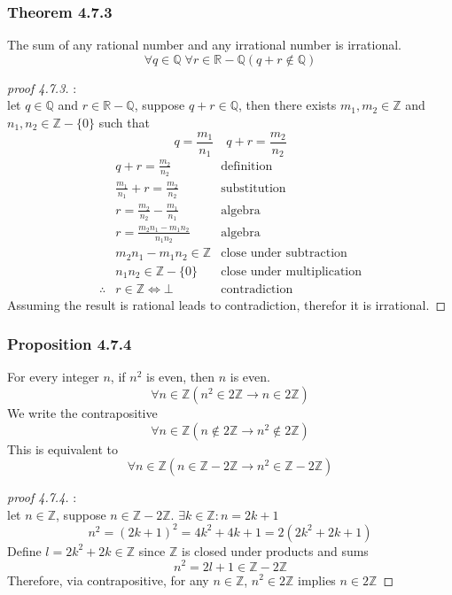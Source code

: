 \documentclass[12pt]{book}
\newcommand{\F}[0]{\bot}
\newcommand{\Z}{\mathbb{Z}}
\newcommand{\R}{\mathbb{R}}
\newcommand{\Q}{\mathbb{Q}}
\newcommand{\paren}[1]{\left( #1 \right)}
\newcommand{\zero}{\{0\}}
\begin{document}
\subsubsection{Theorem 4.7.3}
The sum of any rational number and any irrational number is irrational.
\[
\forall q \in \Q \; \forall r \in \R - \Q \paren{q + r \notin \Q}
\]
\begin{proof}[proof 4.7.3]:\\
let $q \in \Q$ and $r \in \R - \Q$, suppose $q+r \in \Q$, then there exists $m_1,m_2 \in \Z$ and $n_1,n_2 \in \Z - \zero$ such that
\[
q = \frac{m_1}{n_1} \quad q+r = \frac{m_2}{n_2}
\]
\[
\begin{aligned}
    &q + r = \frac{m_2}{n_2} & \text{definition} \\
    &\frac{m_1}{n_1} + r = \frac{m_2}{n_2} & \text{substitution}\\
    &r = \frac{m_2}{n_2} - \frac{m_1}{n_1} &\text{algebra}\\
    &r = \frac{m_2n_1 - m_1n_2}{n_1n_2} & \text{algebra}\\
    &m_2n_1 - m_1n_2 \in \Z & \text{close under subtraction}\\
    &n_1n_2 \in \Z - \zero & \text{close under multiplication}\\
    \therefore & r \in \Z \iff \F & \text{contradiction}
\end{aligned}
\]
Assuming the result is rational leads to contradiction, therefor it is irrational.
\end{proof}
\subsubsection{Proposition 4.7.4}
For every integer $n$, if $n^2$ is even, then $n$ is even. 
\[
\forall n \in \Z \paren{ n^2 \in 2\Z \rightarrow n \in 2\Z}
\]
We write the contrapositive
\[
\forall n \in \Z \paren{n \notin 2\Z \rightarrow n^2 \notin 2\Z}
\]
This is equivalent to
\[
\forall n \in \Z \paren{n \in \Z - 2\Z \rightarrow n^2 \in \Z - 2\Z}
\]
\begin{proof}[proof 4.7.4]:\\
let $n \in \Z$, suppose $n\in \Z - 2\Z$. $\exists k \in \Z : n = 2k+1$\\
\[
n^2 = \paren{2k+1}^2 = 4k^2 + 4k + 1 = 2 \paren{2k^2 + 2k + 1}
\]
Define $ l = 2k^2 + 2k \in \Z$ since $\Z$ is closed under products and sums
\[
n^2 = 2l+1 \in \Z - 2\Z
\]
Therefore, via contrapositive, for any $n \in \Z$, $n^2 \in 2\Z$ implies $n \in 2\Z$

\end{proof}
\end{document}
